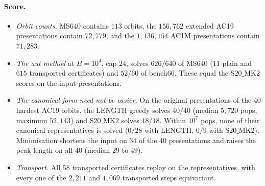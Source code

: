 \documentclass[11pt]{article}
\theoremstyle{definition}
\theoremstyle{remark}
\newcommand{\SMK}{\mathrm{S20\_MK2}}
\begin{document}
\paragraph{Score.}
\begin{itemize}
  \item \emph{Orbit counts.} MS640 contains $113$ orbits, the $156{,}762$ extended AC19 presentations contain
  $72{,}779$, and the $1{,}136{,}154$ AC1M presentations contain $71{,}283$.
  \item \emph{The aut method} at $B=10^4$, cap $24$, solves $626/640$ of MS640 ($11$ plain and $615$ transported
  certificates) and $52/60$ of bench60. These equal the $\SMK$ scores on the input presentations.
  \item \emph{The canonical form need not be easier.} On the original presentations of the $40$ hardest AC19 orbits,
  the LENGTH greedy solves $40/40$ (median $5{,}720$ pops, maximum $52{,}143$) and $\SMK$ solves $18/18$. Within
  $10^7$ pops, none of their canonical representatives is solved ($0/28$ with LENGTH, $0/9$ with $\SMK$).
  Minimisation shortens the input on $34$ of the $40$ presentations and raises the peak length on all $40$ (median
  $29$ to $49$).
  \item \emph{Transport.} All $58$ transported certificates replay on the representatives, with every one of the
  $2{,}211$ and $1{,}069$ transported steps equivariant.
\end{itemize}
\end{document}
